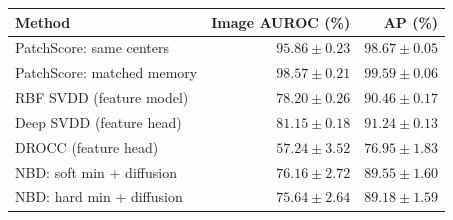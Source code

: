 \begin{tabular}{lrr}
\toprule
\textbf{Method} & \textbf{Image AUROC (\%)} & \textbf{AP (\%)}\\
\midrule
PatchScore: same centers & $95.86\pm0.23$ & $98.67\pm0.05$\\
PatchScore: matched memory & $98.57\pm0.21$ & $99.59\pm0.06$\\
RBF SVDD (feature model) & $78.20\pm0.26$ & $90.46\pm0.17$\\
Deep SVDD (feature head) & $81.15\pm0.18$ & $91.24\pm0.13$\\
DROCC (feature head) & $57.24\pm3.52$ & $76.95\pm1.83$\\
NBD: soft min + diffusion & $76.16\pm2.72$ & $89.55\pm1.60$\\
NBD: hard min + diffusion & $75.64\pm2.64$ & $89.18\pm1.59$\\
\bottomrule
\end{tabular}
